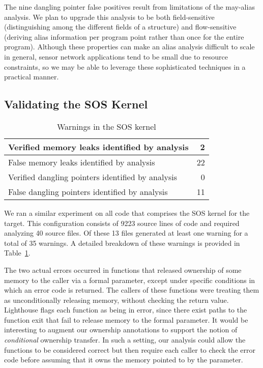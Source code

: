 \smallskip{}

The nine dangling pointer false positives result from limitations of
the may-alias analysis.  
We plan to upgrade this analysis to be both field-sensitive
(distinguishing among the different fields of a structure) and
flow-sensitive (deriving alias information per program point rather
than once for the entire program).  Although these properties can make
an alias analysis difficult to scale in general, sensor network
applications tend to be small due to resource constraints, so we may
be able to leverage these sophisticated techniques in a practical manner.


\subsection{Validating the SOS Kernel}

\begin{table}
\caption{Warnings in the SOS kernel}
%
\label{tab:kernel}
\centering 
\begin{tabular}{| l | r |}
    \hline 
    Verified memory leaks identified by analysis & 2 \\
    \hline
    False memory leaks identified by analysis & 22 \\
    \hline 
    Verified dangling pointers identified by analysis & 0 \\
    \hline 
    False dangling pointers identified by analysis & 11 \\
    \hline 
\end{tabular} 
%
\end{table}


We ran a similar experiment on all code that comprises the SOS kernel
for the  target.  This configuration consists of 9223
source lines of code and required analyzing 40 source files.  Of these
13 files generated at least one warning for a total of 35 warnings.  A
detailed breakdown of these warnings is provided in
Table~\ref{tab:kernel}.

The two actual errors occurred in
functions that released ownership of some memory to the
caller via a formal parameter,
except 
%
%
under specific conditions in which 
%
an error code is returned.
%
The callers of these functions were treating them as unconditionally
releasing memory, without checking the return value.  Lighthouse flags
each function as being in error, since there exist paths to the
function exit that fail to release memory to the formal parameter.  
It would be
interesting to augment our ownership annotations to support the notion
of {\em conditional} ownership transfer.  In such a setting, our
analysis could allow the functions to be considered correct but then
require each caller to check the error code before assuming that it owns
the memory pointed to by the parameter.

